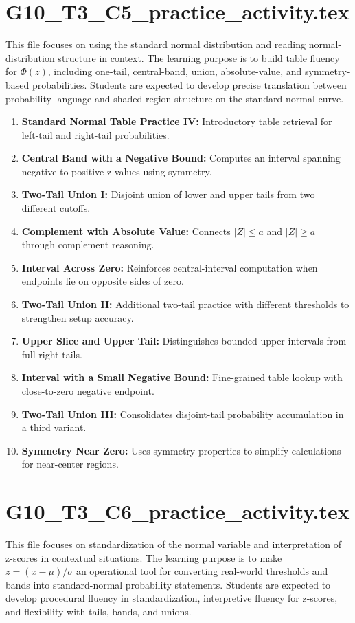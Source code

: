 \section{G10\_T3\_C5\_practice\_activity.tex}
This file focuses on using the standard normal distribution and reading normal-distribution structure in context. The learning purpose is to build table fluency for \(\Phi(z)\), including one-tail, central-band, union, absolute-value, and symmetry-based probabilities. Students are expected to develop precise translation between probability language and shaded-region structure on the standard normal curve.

\begin{enumerate}
  \item \textbf{Standard Normal Table Practice IV:} Introductory table retrieval for left-tail and right-tail probabilities.
  \item \textbf{Central Band with a Negative Bound:} Computes an interval spanning negative to positive z-values using symmetry.
  \item \textbf{Two-Tail Union I:} Disjoint union of lower and upper tails from two different cutoffs.
  \item \textbf{Complement with Absolute Value:} Connects \(|Z|\le a\) and \(|Z|\ge a\) through complement reasoning.
  \item \textbf{Interval Across Zero:} Reinforces central-interval computation when endpoints lie on opposite sides of zero.
  \item \textbf{Two-Tail Union II:} Additional two-tail practice with different thresholds to strengthen setup accuracy.
  \item \textbf{Upper Slice and Upper Tail:} Distinguishes bounded upper intervals from full right tails.
  \item \textbf{Interval with a Small Negative Bound:} Fine-grained table lookup with close-to-zero negative endpoint.
  \item \textbf{Two-Tail Union III:} Consolidates disjoint-tail probability accumulation in a third variant.
  \item \textbf{Symmetry Near Zero:} Uses symmetry properties to simplify calculations for near-center regions.
\end{enumerate}

\section{G10\_T3\_C6\_practice\_activity.tex}
This file focuses on standardization of the normal variable and interpretation of z-scores in contextual situations. The learning purpose is to make \(z=(x-\mu)/\sigma\) an operational tool for converting real-world thresholds and bands into standard-normal probability statements. Students are expected to develop procedural fluency in standardization, interpretive fluency for z-scores, and flexibility with tails, bands, and unions.

